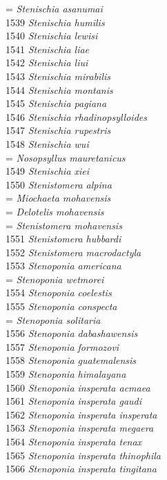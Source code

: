\documentclass[
]{article}
\begin{document}
= \emph{Stenischia asanumai}\\
1539 \emph{Stenischia humilis}\\
1540 \emph{Stenischia lewisi}\\
1541 \emph{Stenischia liae}\\
1542 \emph{Stenischia liui}\\
1543 \emph{Stenischia mirabilis}\\
1544 \emph{Stenischia montanis}\\
1545 \emph{Stenischia pagiana}\\
1546 \emph{Stenischia rhadinopsylloides}\\
1547 \emph{Stenischia rupestris}\\
1548 \emph{Stenischia wui}\\
= \emph{Nosopsyllus mauretanicus}\\
1549 \emph{Stenischia xiei}\\
1550 \emph{Stenistomera alpina}\\
= \emph{Miochaeta mohavensis}\\
= \emph{Delotelis mohavensis}\\
= \emph{Stenistomera mohavensis}\\
1551 \emph{Stenistomera hubbardi}\\
1552 \emph{Stenistomera macrodactyla}\\
1553 \emph{Stenoponia americana}\\
= \emph{Stenoponia wetmorei}\\
1554 \emph{Stenoponia coelestis}\\
1555 \emph{Stenoponia conspecta}\\
= \emph{Stenoponia solitaria}\\
1556 \emph{Stenoponia dabashawensis}\\
1557 \emph{Stenoponia formozovi}\\
1558 \emph{Stenoponia guatemalensis}\\
1559 \emph{Stenoponia himalayana}\\
1560 \emph{Stenoponia insperata acmaea}\\
1561 \emph{Stenoponia insperata gaudi}\\
1562 \emph{Stenoponia insperata insperata}\\
1563 \emph{Stenoponia insperata megaera}\\
1564 \emph{Stenoponia insperata tenax}\\
1565 \emph{Stenoponia insperata thinophila}\\
1566 \emph{Stenoponia insperata tingitana}\\
\end{document}
